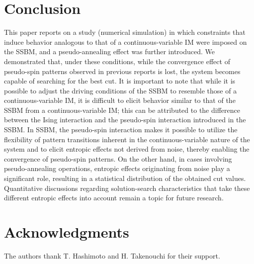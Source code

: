 \documentclass[%
 reprint,
 amsmath,amssymb,
 aps,
]{revtex4-2}
\begin{document}
\section{Conclusion}

This paper reports on a study (numerical simulation) in which constraints that induce behavior analogous to that of a continuous-variable IM were imposed on the SSBM, and a pseudo-annealing effect was further introduced. We demonstrated that, under these conditions, while the convergence effect of pseudo-spin patterns observed in previous reports is lost, the system becomes capable of searching for the best cut. It is important to note that while it is possible to adjust the driving conditions of the SSBM to resemble those of a continuous-variable IM, it is difficult to elicit behavior similar to that of the SSBM from a continuous-variable IM; this can be attributed to the difference between the Ising interaction and the pseudo-spin interaction introduced in the SSBM. In SSBM, the pseudo-spin interaction makes it possible to utilize the flexibility of pattern transitions inherent in the continuous-variable nature of the system and to elicit entropic effects not derived from noise, thereby enabling the convergence of pseudo-spin patterns. On the other hand, in cases involving pseudo-annealing operations, entropic effects originating from noise play a significant role, resulting in a statistical distribution of the obtained cut values. Quantitative discussions regarding solution-search characteristics that take these different entropic effects into account remain a topic for future research.

\section*{Acknowledgments}
The authors thank T. Hashimoto and H. Takenouchi for their support.
\end{document}
